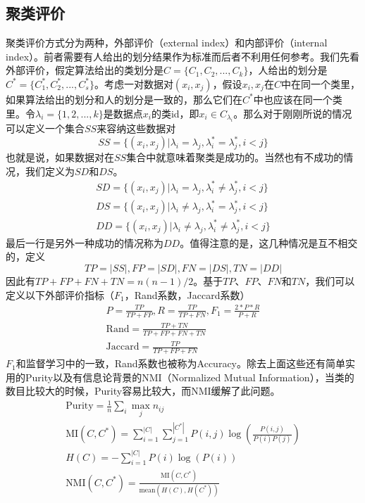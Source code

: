 \subsection{聚类评价}
聚类评价方式分为两种，外部评价（external index）和内部评价（internal index）。前者需要有人给出的划分结果作为标准而后者不利用任何参考。我们先看外部评价，假定算法给出的类划分是$C=\{C_1, C_2,...,C_k\}$，人给出的划分是$C^* = \{C_1^*,C_2^*,...,C_s^*\}$。考虑一对数据对$(x_i,x_j)$，假设$x_i,x_j$在$C$中在同一个类里，如果算法给出的划分和人的划分是一致的，那么它们在$C^*$中也应该在同一个类里。令$\lambda_i = \{1,2,...,k\}$是数据点$x_i$的类id，即$x_i \in C_{\lambda_i}$。那么对于刚刚所说的情况可以定义一个集合$SS$来容纳这些数据对
\begin{equation*}
    SS = \{(x_i,x_j)|\lambda_i = \lambda_j,\lambda_i^* = \lambda_j^*, i<j \}
\end{equation*}
也就是说，如果数据对在$SS$集合中就意味着聚类是成功的。当然也有不成功的情况，我们定义为$SD$和$DS$。
\begin{gather*}
    SD = \{(x_i,x_j)|\lambda_i = \lambda_j,\lambda_i^* \neq \lambda_j^*, i<j \} \\
    DS = \{(x_i,x_j)|\lambda_i \neq \lambda_j,\lambda_i^* = \lambda_j^*, i<j \} \\
    DD = \{(x_i,x_j)|\lambda_i \neq \lambda_j,\lambda_i^* \neq \lambda_j^*, i<j \}
\end{gather*}
最后一行是另外一种成功的情况称为$DD$。值得注意的是，这几种情况是互不相交的，定义
\begin{equation*}
    TP = |SS|, FP = |SD|, FN = |DS|, TN = |DD|
\end{equation*}
因此有$TP+FP+FN+TN=n(n-1)/2$。基于$TP$、$FP$、$FN$和$TN$，我们可以定义以下外部评价指标（$F_1$，Rand系数，Jaccard系数）
\begin{gather*}
    P = \frac{TP}{TP+FP},R = \frac{TP}{TP+FN}, F_1 = \frac{2*P*R}{P+R} \\
    \text{Rand} = \frac{TP+TN}{TP+FP+FN+TN} \\ 
    \text{Jaccard} = \frac{TP}{TP+FP+FN}
\end{gather*}
$F_1$和监督学习中的一致，Rand系数也被称为Accuracy。除去上面这些还有简单实用的Purity以及有信息论背景的NMI（Normalized Mutual Information），当类的数目比较大的时候，Purity容易比较大，而NMI缓解了此问题。
\begin{gather*}
    \text{Purity} = \frac{1}{n} \sum_i \max_j n_{ij} \\
    \text{MI}(C, C^*) = \sum_{i=1}^{|C|}\sum_{j=1}^{|C^*|}P(i, j)\log\left(\frac{P(i,j)}{P(i)P(j)}\right) \\
    H(C) = - \sum_{i=1}^{|C|}P(i)\log(P(i)) \\
    \text{NMI}(C, C^*) = \frac{\text{MI}(C, C^*)}{\text{mean}(H(C), H(C^*))}
\end{gather*}

